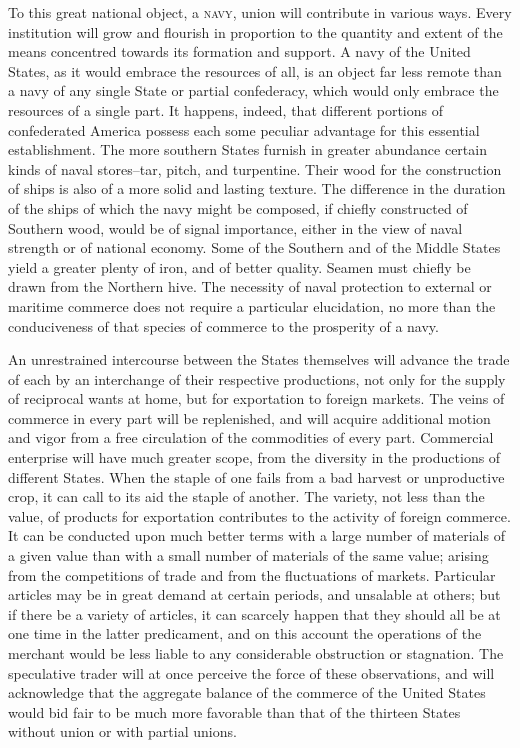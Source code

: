 To this great national object, a \textsc{navy}, union will contribute in various ways. Every institution will grow and flourish in proportion to the quantity and extent of the means concentred towards its formation and support. A navy of the United States, as it would embrace the resources of all, is an object far less remote than a navy of any single State or partial confederacy, which would only embrace the resources of a single part. It happens, indeed, that different portions of confederated America possess each some peculiar advantage for this essential establishment. The more southern States furnish in greater abundance certain kinds of naval stores--tar, pitch, and turpentine. Their wood for the construction of ships is also of a more solid and lasting texture. The difference in the duration of the ships of which the navy might be composed, if chiefly constructed of Southern wood, would be of signal importance, either in the view of naval strength or of national economy. Some of the Southern and of the Middle States yield a greater plenty of iron, and of better quality. Seamen must chiefly be drawn from the Northern hive. The necessity of naval protection to external or maritime commerce does not require a particular elucidation, no more than the conduciveness of that species of commerce to the prosperity of a navy.

An unrestrained intercourse between the States themselves will advance the trade of each by an interchange of their respective productions, not only for the supply of reciprocal wants at home, but for exportation to foreign markets. The veins of commerce in every part will be replenished, and will acquire additional motion and vigor from a free circulation of the commodities of every part. Commercial enterprise will have much greater scope, from the diversity in the productions of different States. When the staple of one fails from a bad harvest or unproductive crop, it can call to its aid the staple of another. The variety, not less than the value, of products for exportation contributes to the activity of foreign commerce. It can be conducted upon much better terms with a large number of materials of a given value than with a small number of materials of the same value; arising from the competitions of trade and from the fluctuations of markets. Particular articles may be in great demand at certain periods, and unsalable at others; but if there be a variety of articles, it can scarcely happen that they should all be at one time in the latter predicament, and on this account the operations of the merchant would be less liable to any considerable obstruction or stagnation. The speculative trader will at once perceive the force of these observations, and will acknowledge that the aggregate balance of the commerce of the United States would bid fair to be much more favorable than that of the thirteen States without union or with partial unions.

